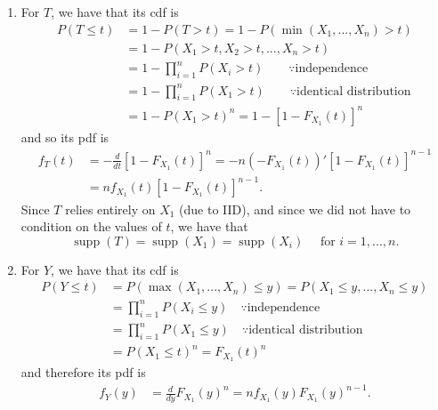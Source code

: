 \documentclass[notoc,notitlepage]{tufte-book}
\DeclareMathOperator{\supp}{supp }
\begin{document}
\begin{solution}
  \begin{enumerate}
    \item For $T$, we have that its cdf is
      \begin{align*}
        P(T \leq t) &= 1 - P(T > t) = 1 - P( \min(X_1, ..., X_n) > t ) \\
                    &= 1 - P( X_1 > t, X_2 > t, ..., X_n > t ) \\
                    &= 1 - \prod_{i=1}^{n} P(X_i > t) \qquad \because \text{independence} \\
                    &= 1 - \prod_{i=1}^{n} P(X_1 > t) \qquad \because \text{identical distribution} \\
                    &= 1 - P(X_1 > t)^n = 1 - [ 1 - F_{X_1}(t) ]^n
      \end{align*}
      and so its pdf is
      \begin{align*}
        f_T(t) &= - \frac{d}{dt} [ 1 - F_{X_1}(t) ]^n = -n ( -F_{X_1}(t) )' [ 1 - F_{X_1}(t) ]^{n - 1} \\
               &= n f_{X_1}(t) [ 1 - F_{X_1}(t) ]^{n - 1}.
      \end{align*}
      Since $T$ relies entirely on $X_1$ (due to IID), and since we did not have to condition on the values of $t$, we have that
      \begin{equation*}
        \supp(T) = \supp(X_1) = \supp(X_i) \quad \text{ for } i = 1, ..., n.
      \end{equation*}

    \item For $Y$, we have that its cdf is
      \begin{align*}
        P(Y \leq t) &= P( \max(X_1, ..., X_n) \leq y) = P(X_1 \leq y, ..., X_n \leq y) \\
                    &= \prod_{i=1}^{n} P(X_i \leq y) \quad \because \text{independence} \\
                    &= \prod_{i=1}^{n} P(X_1 \leq y) \quad \because \text{identical distribution} \\
                    &= P(X_1 \leq t)^n = F_{X_1}(t)^n
      \end{align*}
      and therefore its pdf is
      \begin{align*}
        f_Y(y) &= \frac{d}{dy} F_{X_1}(y)^n = n f_{X_1}(y) F_{X_1}(y)^{n - 1}.
      \end{align*}
  \end{enumerate}
\end{solution}
\end{document}
